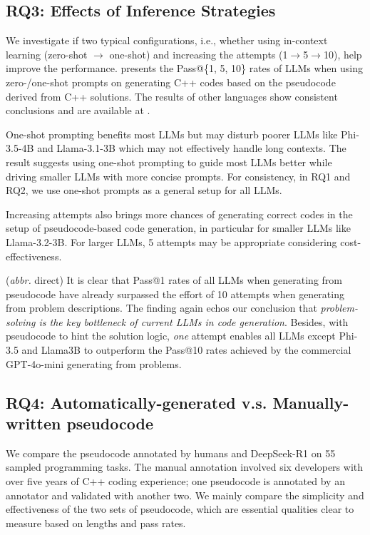 \subsection{RQ3: Effects of Inference Strategies}


We investigate if two typical configurations, i.e., whether using in-context learning (zero-shot $\rightarrow$ one-shot) and increasing the attempts (1$\rightarrow$5$\rightarrow$10), help improve the performance. 
 presents the Pass@\{1, 5, 10\} rates of LLMs when using zero-/one-shot prompts on generating C++ codes based on the pseudocode derived from C++ solutions. The results of other languages show consistent conclusions and are available at .

%
One-shot prompting benefits most LLMs but may disturb poorer LLMs like Phi-3.5-4B and Llama-3.1-3B which may not effectively handle long contexts. The result suggests using one-shot prompting to guide most LLMs better while driving smaller LLMs with more concise prompts. For consistency, in RQ1 and RQ2, we use one-shot prompts as a general setup for all LLMs.

 Increasing attempts also brings more chances of generating correct codes in the setup of pseudocode-based code generation, in particular for smaller LLMs like Llama-3.2-3B. For larger LLMs, 5 attempts may be appropriate considering cost-effectiveness.

 (\textit{abbr.} direct) It is clear that Pass@1 rates of all LLMs when generating from pseudocode have already surpassed the effort of 10 attempts when generating from problem descriptions. The finding again echos our conclusion that \textit{problem-solving is the key bottleneck of current LLMs in code generation}. Besides, with pseudocode to hint the solution logic, \textit{one} attempt enables all LLMs except Phi-3.5 and Llama3B to outperform the Pass@{10} rates achieved by the commercial GPT-4o-mini generating from problems.

\subsection{RQ4: Automatically-generated v.s. Manually-written pseudocode}\label{subsec:resrq4}




\noindent We compare the pseudocode annotated by humans and DeepSeek-R1 on 55 sampled programming tasks. The manual annotation involved six developers with over five years of C++ coding experience; one pseudocode is annotated by an annotator and validated with another two. We mainly compare the simplicity and effectiveness of the two sets of pseudocode, which are essential qualities clear to measure based on lengths and pass rates.


